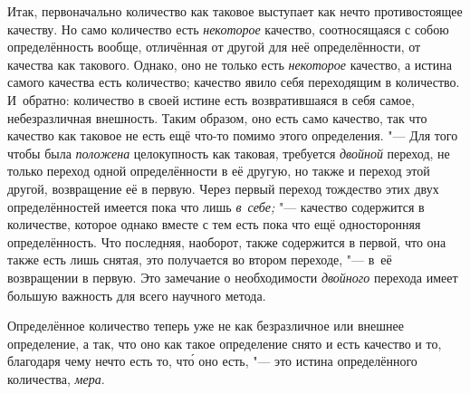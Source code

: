 Итак, первоначально количество как таковое выступает как нечто противостоящее
качеству. Но само количество есть {\em некоторое} качество, соотносящаяся
с собою определённость вообще, отличённая от другой для неё определённости,
от качества как такового. Однако, оно не только есть {\em некоторое} качество,
а истина самого качества есть количество; качество явило себя переходящим
в количество. И~обратно: количество в своей истине есть возвратившаяся в себя
самое, небезразличная внешность. Таким образом, оно есть само качество, так что
качество как таковое не есть ещё что-то помимо этого определения. "--- Для того
чтобы была {\em положена} целокупность как таковая, требуется {\em двойной}
переход, не только переход одной определённости в её другую, но также и переход
этой другой, возвращение её в первую. Через первый переход тождество этих двух
определённостей имеется пока что лишь {\em в~себе;} "--- качество содержится
в количестве, которое однако вместе с тем есть пока что ещё односторонняя
определённость. Что последняя, наоборот, также содержится в первой, что она
также есть лишь снятая, это получается во втором переходе, "--- в~её
возвращении в первую. Это замечание о необходимости {\em двойного} перехода
имеет большую важность для всего научного метода.

Определённое количество теперь уже не как безразличное или внешнее определение,
а так, что оно как такое определение снято и есть качество и то, благодаря чему
нечто есть то, чт\'{о} оно есть, "--- это истина определённого количества,
{\em мера}.

\subremark{}

